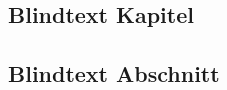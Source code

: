 \begin{appendices}

\chapter{Blindtext Kapitel}
\blindtext

\section{Blindtext Abschnitt}
\blindtext

\end{appendices}